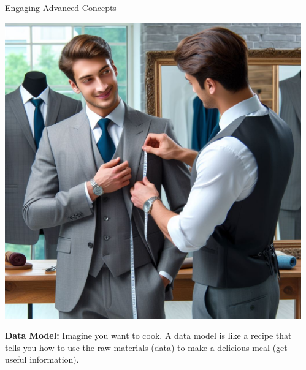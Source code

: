 \documentclass[final]{beamer}
\begin{document}
\begin{frame}[t]{}
\begin{columns}[t]
\begin{column}{.3\textwidth}
\begin{block}{Engaging Advanced Concepts}
				\begin{minipage}{0.3\textwidth}
					\centering
					\includegraphics[width=\linewidth]{./images/1-2-3-TailorSuit.jpeg}
				\end{minipage}
				\hfill
				\begin{minipage}{0.68\textwidth}
					\textbf{Data Model:} Imagine you want to cook. A data model is like a recipe that tells you how to use the raw materials (data) to make a delicious meal (get useful information).
				\end{minipage}

				\vspace{1.75cm}

			\end{block}

		\end{column}

		\begin{column}{.33\textwidth}

			\vspace{-0.6cm}

			\begin{block}{}
				\centering
				\Large \textbf{\inserttitle}\\

				\vspace{1cm}


\end{block}
\end{column}
\end{columns}
\end{frame}
\end{document}
